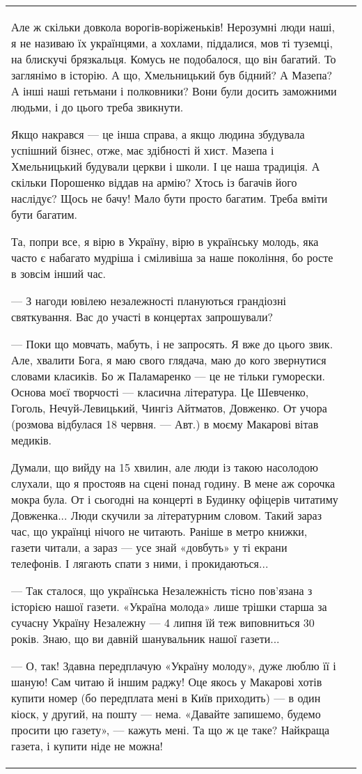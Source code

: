 \begin{longtable}{|p{}|p{}|}
\\


Але ж скільки довкола ворогів-воріженьків! Нерозумні люди наші, я не називаю їх українцями, а хохлами, піддалися, мов ті туземці, на блискучі брязкальця. Комусь не подобалося, що він багатий. То заглянімо в історію. А що, Хмельницький був бідний? А Мазепа? А інші наші гетьмани і полковники? Вони були досить заможними людьми, і до цього треба звикнути.

Якщо накрався — це інша справа, а якщо людина збудувала успішний бізнес, отже,
має здібності й хист. Мазепа і Хмельницький будували церкви і школи. І це наша
традиція. А скільки Порошенко віддав на армію? Хтось із багачів його наслідує?
Щось не бачу! Мало бути просто багатим. Треба вміти бути багатим.

Та, попри все, я вірю в Україну, вірю в українську молодь, яка часто є набагато
мудріша і сміливіша за наше покоління, бо росте в зовсім інший час.


— З нагоди ювілею незалежності плануються грандіозні святкування. Вас до участі в концертах запрошували?

— Поки що мовчать, мабуть, і не запросять. Я вже до цього звик. Але, хвалити
Бога, я маю свого глядача, маю до кого звернутися словами класиків. Бо ж
Паламаренко — це не тільки гуморески. Основа моєї творчості — класична
література. Це Шевченко, Гоголь, Нечуй-Левицький, Чингіз Айтматов, Довженко. От
учора (розмова відбулася 18 червня. — Авт.) в моєму Макарові вітав медиків.

Думали, що вийду на 15 хвилин, але люди із такою насолодою слухали, що я
простояв на сцені понад годину. В мене аж сорочка мокра була. От і сьогодні на
концерті в Будинку офіцерів читатиму Довженка... Люди скучили за літературним
словом. Такий зараз час, що українці нічого не читають. Раніше в метро книжки,
газети читали, а зараз — усе знай «довбуть» у ті екрани телефонів. І лягають
спати з ними, і прокидаються...


— Так сталося, що українська Незалежність тісно пов’язана з історією нашої
газети. «Україна молода» лише трішки старша за сучасну Україну Незалежну — 4
липня їй теж виповниться 30 років. Знаю, що ви давній шанувальник нашої
газети...

— О, так! Здавна передплачую «Україну молоду», дуже люблю її і шаную! Сам читаю
й іншим раджу! Оце якось у Макарові хотів купити номер (бо передплата мені в
Київ приходить) — в один кіоск, у другий, на пошту — нема. «Давайте запишемо,
будемо просити цю газету», — кажуть мені. Та що ж це таке? Найкраща газета, і
купити ніде не можна!


\end{longtable}
